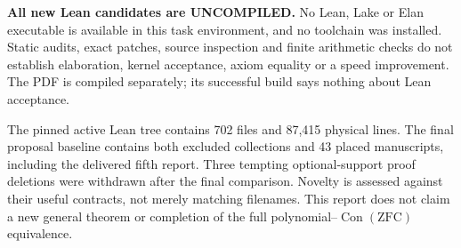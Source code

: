\textbf{All new Lean candidates are UNCOMPILED.} No Lean, Lake or Elan executable is available in this task environment, and no toolchain was installed. Static audits, exact patches, source inspection and finite arithmetic checks do not establish elaboration, kernel acceptance, axiom equality or a speed improvement. The PDF is compiled separately; its successful build says nothing about Lean acceptance.

The pinned active Lean tree contains 702 files and 87,415 physical lines. The final proposal baseline contains both excluded collections and 43 placed manuscripts, including the delivered fifth report. Three tempting optional-support proof deletions were withdrawn after the final comparison. Novelty is assessed against their useful contracts, not merely matching filenames. This report does not claim a new general theorem or completion of the full polynomial--$\operatorname{Con}(\mathrm{ZFC})$ equivalence.
